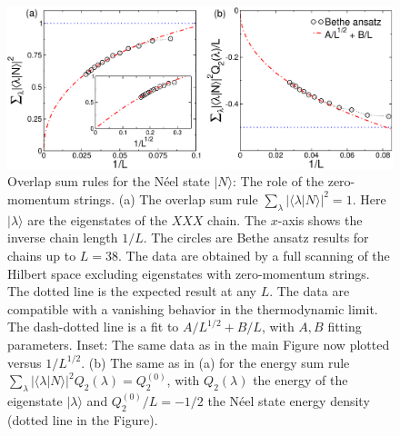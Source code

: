 \documentclass[11pt]{iopart}
\begin{document}
\begin{figure}[t]
\begin{center}
\includegraphics[width=.9\textwidth]{Neel}
\end{center}
\caption{Overlap sum rules for the N\'eel state $|N\rangle$: The role of 
 the zero-momentum strings. (a) The overlap sum rule $\sum_{\lambda}|
 \langle\lambda|N\rangle|^2=1$. Here $|\lambda\rangle$ are the eigenstates  
 of the $XXX$ chain. The $x$-axis shows the inverse chain length $1/L$. 
 The circles are Bethe ansatz results for chains up to $L=38$. 
 The data are obtained by  a full scanning of the  Hilbert space excluding eigenstates  
 with  zero-momentum strings. 
 The dotted line is the expected result at any $L$. 
 The data are compatible with a vanishing behavior in the thermodynamic limit. 
 The dash-dotted line is a fit to $A/L^{1/2}+B/L$, with $A,B$ fitting parameters. 
 Inset: The same data as in the main Figure now plotted versus $1/L^{1/2}$. 
 (b) The same as in (a) for the energy sum rule $\sum_{\lambda}|\langle
 \lambda|N\rangle|^2Q_2(\lambda)=Q_2^{(0)}$, with $Q_2(\lambda)$ the 
 energy of the eigenstate $|\lambda\rangle$ and $Q_2^{(0)}/L=-1/2$ the 
 N\'eel state energy density (dotted line in the Figure). 
}
\label{fig1:Neel-sr}
\end{figure}
\end{document}
